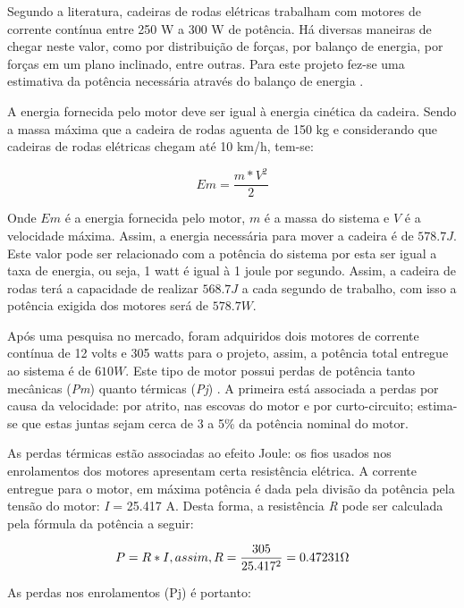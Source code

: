   Segundo a literatura, cadeiras de rodas elétricas trabalham com motores de corrente contínua entre 250 W a 300 W de potência. Há diversas maneiras de chegar neste valor, como por distribuição de forças, por balanço de energia, por forças em um plano inclinado, entre outras. Para este projeto fez-se uma estimativa da potência necessária através do balanço de energia \cite{acionamento_motores_cadeira}.

  A energia fornecida pelo motor deve ser igual à energia cinética da cadeira. Sendo a massa máxima que a cadeira de rodas aguenta de 150 kg e considerando que cadeiras de rodas elétricas chegam até 10 km/h, tem-se:


  \begin{equation}
    Em = \frac{m*V^2}{2}
  \end{equation}

  Onde $Em$ é a energia fornecida pelo motor, $m$ é a massa do sistema e $V$ é a velocidade máxima. Assim, a energia necessária para mover a cadeira é de $578.7 J$. Este valor pode ser relacionado com a potência do sistema por esta ser igual a taxa de energia, ou seja, 1 watt é igual à 1 joule por segundo. Assim, a cadeira de rodas terá a capacidade de realizar $568.7 J$ a cada segundo de trabalho, com isso a potência exigida dos motores será de $578.7 W$.

  Após uma pesquisa no mercado, foram adquiridos dois motores de corrente contínua de 12 volts e 305 watts para o projeto, assim, a potência total entregue ao sistema é de $610 W$. Este tipo de motor possui perdas de potência tanto mecânicas (\textit{Pm}) quanto térmicas (\textit{Pj}) \cite{perdas}. A primeira está associada a perdas por causa da velocidade: por atrito, nas escovas do motor e por curto-circuito; estima-se que estas juntas sejam cerca de 3 a 5\% da potência nominal do motor.

  As perdas térmicas estão associadas ao efeito Joule: os fios usados nos enrolamentos dos motores apresentam certa resistência elétrica. A corrente entregue para o motor, em máxima potência é dada pela divisão da potência pela tensão do motor: \textit{I} = 25.417 A. Desta forma, a resistência \textit{R} pode ser calculada pela fórmula da potência a seguir:

  \begin{equation}
  P = R*I, assim, R = \frac{305}{25.417^2} = 0.47231 \ohm
  \end{equation}

  As perdas nos enrolamentos (Pj) é portanto:

